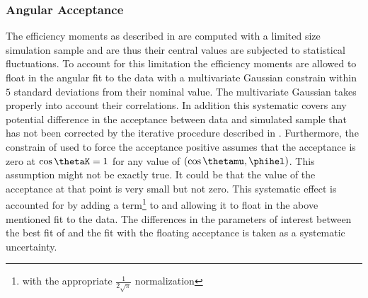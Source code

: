 \subsubsection{Angular Acceptance}
\label{systAngAcc}
The efficiency moments as described in  are computed with a limited size simulation sample
and are thus their central values are subjected to statistical fluctuations. To account for this limitation the
efficiency moments are allowed to float in the angular fit to the data with a multivariate Gaussian constrain within $5$
standard deviations from their nominal value. The multivariate Gaussian takes properly into account their correlations.
In addition this systematic covers any potential difference in the acceptance between data and simulated sample
that has not been corrected by the iterative procedure described in . Furthermore,
the constrain of  used to force the acceptance positive assumes that the acceptance is zero
at $\cos\thetaK=1$ for any value of $(\cos\thetamu,\phihel)$. This assumption might not be exactly true. It could be
that the value of the acceptance at that point is very small but not zero. This systematic effect is accounted for
by adding a term\footnote{with the appropriate $\frac{1}{2\sqrt{\pi}}$ normalization} to  and allowing it to
float in the above mentioned fit to the data. The differences in the parameters of interest between the best fit
of  and the fit with the floating acceptance is taken as a systematic uncertainty.

